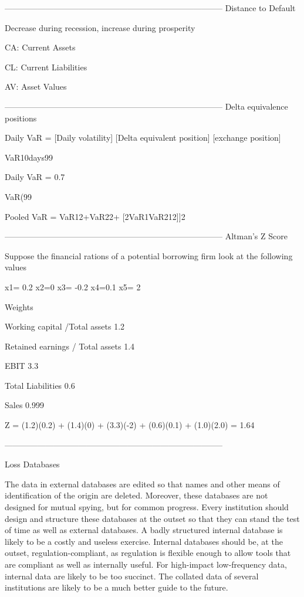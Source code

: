 --------------------------------------------------------------------------------
Distance to Default

Decrease during recession, increase during prosperity




CA: Current Assets

CL: Current Liabilities

AV: Asset Values



--------------------------------------------------------------------------------
Delta equivalence positions


Daily VaR = [Daily volatility]  [Delta equivalent position] [exchange position]



VaR10days99%


Daily VaR = 0.7%


VaR(99%


Pooled VaR = VaR12+VaR22+ [2VaR1VaR212]]2



--------------------------------------------------------------------------------
Altman's Z Score


Suppose the financial rations of a potential borrowing firm look at the following values



x1= 0.2    x2=0    x3= -0.2    x4=0.1    x5= 2 



Weights 

Working capital /Total assets 1.2

Retained earnings / Total assets 1.4

EBIT    3.3

Total Liabilities 0.6

Sales     0.999



Z = (1.2)(0.2) + (1.4)(0) + (3.3)(-2) + (0.6)(0.1) + (1.0)(2.0) = 1.64






--------------------------------------------------------------------------------


Loss Databases

 

The data in external databases are edited so that names and other means of identification of the origin are deleted. Moreover, these databases are not designed for mutual spying, but for common progress. Every institution should design and structure these databases at the outset so that they can stand the test of time as well as external databases. A badly structured internal database is likely to be a costly and useless exercise. Internal databases should be, at the outset, regulation-compliant, as regulation is flexible enough to allow tools that are compliant as well as internally useful. For high-impact low-frequency data, internal data are likely to be too succinct. The collated data of several institutions are likely to be a much better guide to the future.


